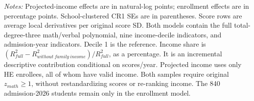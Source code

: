 \begin{table}[!htbp]
\begin{minipage}{0.98\textwidth}\footnotesize
\textit{Notes:} Projected-income effects are in natural-log points; enrollment effects are in percentage points. School-clustered CR1 SEs are in parentheses. Score rows are average local derivatives per original score SD. Both models contain the full total-degree-three math/verbal polynomial, nine income-decile indicators, and admission-year indicators. Decile 1 is the reference. Income share is $(R^2_{full}-R^2_{without\ family\ income})/R^2_{full}$, as a percentage. It is an incremental descriptive contribution conditional on scores/year. Projected income uses only HE enrollees, all of whom have valid income. Both samples require original $z_{math} \geq 1$, without restandardizing scores or re-ranking income. The 840 admission-2026 students remain only in the enrollment model.
\end{minipage}
\end{table}
